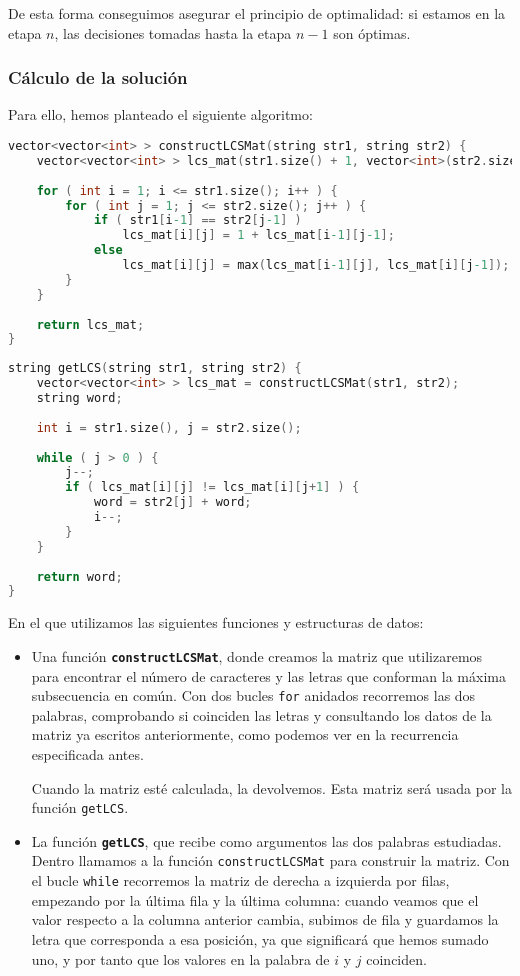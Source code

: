 \documentclass[10pt, a4paper]{article}
\theoremstyle{theorem-style}
\theoremstyle{theorem-style}
\theoremstyle{definition-style}
\theoremstyle{remark-style}
\theoremstyle{example-style}
\theoremstyle{definition-style}
\theoremstyle{remark-style}
\begin{document}
De esta forma conseguimos asegurar el principio de optimalidad: si estamos en la etapa $n$, las decisiones tomadas hasta la etapa $n-1$ son óptimas.


\subsubsection{Cálculo de la solución}

Para ello, hemos planteado el siguiente algoritmo:

\begin{lstlisting}[language=C]
vector<vector<int> > constructLCSMat(string str1, string str2) {
	vector<vector<int> > lcs_mat(str1.size() + 1, vector<int>(str2.size() + 1, 0));
	
	for ( int i = 1; i <= str1.size(); i++ ) {
		for ( int j = 1; j <= str2.size(); j++ ) {
			if ( str1[i-1] == str2[j-1] )
				lcs_mat[i][j] = 1 + lcs_mat[i-1][j-1];
			else
				lcs_mat[i][j] = max(lcs_mat[i-1][j], lcs_mat[i][j-1]);
		}
	}
	
	return lcs_mat;
}
\end{lstlisting}
\pagebreak
\begin{lstlisting}[language=C]
string getLCS(string str1, string str2) {
	vector<vector<int> > lcs_mat = constructLCSMat(str1, str2);
	string word;
	
	int i = str1.size(), j = str2.size();
	
	while ( j > 0 ) {
		j--;
		if ( lcs_mat[i][j] != lcs_mat[i][j+1] ) {
			word = str2[j] + word;
			i--;
		}
	}
	
	return word;
}
\end{lstlisting}

En el que utilizamos las siguientes funciones y estructuras de datos:

\begin{itemize}
	\item Una función \textbf{\texttt{constructLCSMat}}, donde creamos la matriz que utilizaremos para encontrar el número de caracteres y las letras que conforman la máxima subsecuencia en común. Con dos bucles \texttt{for} anidados recorremos las dos palabras, comprobando si coinciden las letras y consultando los datos de la matriz ya escritos anteriormente, como podemos ver en la recurrencia especificada antes.

	Cuando la matriz esté calculada, la devolvemos. Esta matriz será usada por la función \texttt{getLCS}.
	\item La función \textbf{\texttt{getLCS}}, que recibe como argumentos las dos palabras estudiadas. Dentro llamamos a la función \texttt{constructLCSMat} para construir la matriz. Con el bucle \texttt{while} recorremos la matriz de derecha a izquierda por filas, empezando por la última fila y la última columna: cuando veamos que el valor respecto a la columna anterior cambia, subimos de fila y guardamos la letra que corresponda a esa posición, ya que significará que hemos sumado uno, y por tanto que los valores en la palabra de $i$ y $j$ coinciden.
\end{itemize}
\pagebreak
\end{document}
